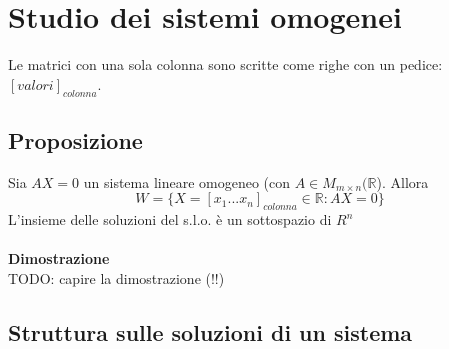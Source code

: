 \section{Studio dei sistemi omogenei}
Le matrici con una sola colonna sono scritte come righe con un pedice: $[valori]_{colonna}$. 

\subsection{Proposizione}
Sia $AX=0$ un sistema lineare omogeneo (con $A\in M_{m\times n}(\mathbb{R}$). Allora 
\[W=\{X=[x_1...x_n]_{colonna} \in\mathbb{R}:AX=0\}\]
L'insieme delle soluzioni del s.l.o. è un sottospazio di $R^n$
\\
\\\textbf{Dimostrazione}
\\TODO: capire la dimostrazione (!!)

\subsection{Struttura sulle soluzioni di un sistema}